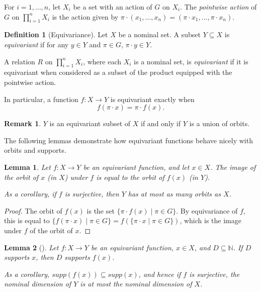 \documentclass[11pt,a4paper]{amsart}
\newtheorem{lemma}{Lemma}
\theoremstyle{definition}
\newtheorem{definition}{Definition}
\newtheorem{remark}{Remark}
\newcommand{\bb}{\mathbb}
\begin{document}
For $i=1, \ldots, n$, let $X_i$ be a set with an action of $G$ on $X_i$. 
The \emph{pointwise action} of $G$ on $\prod_{i=1}^n X_i$ is the action given by $\pi \cdot (x_1, \ldots, x_n) = (\pi \cdot x_1, \ldots, \pi \cdot x_n)$.

\begin{definition}[Equivariance]
    Let $X$ be a nominal set.
    A subset $Y \subseteq X$ is \emph{equivariant} if for any $y \in Y$ and $\pi \in G$, $\pi \cdot y \in Y$. 
    
    A relation $R$ on $\prod_{i=1}^n X_i$, where each $X_i$ is a nominal set, is \emph{equivariant} if it is equivariant when considered as a subset of the product equipped with the pointwise action. 
    
    In particular, a function $f : X \to Y$ is equivariant exactly when
    \[
    f(\pi \cdot x) = \pi \cdot f(x).
    \]
\end{definition}

\begin{remark}
    $Y$ is an equivariant subset of $X$ if and only if $Y$ is a union of orbits.
\end{remark}

The following lemmas demonstrate how equivariant functions behave nicely with orbits and supports.

\begin{lemma} \label{lem:orbit of image under equivariant function}
    Let $f : X \to Y$ be an equivariant function, and let $x \in X$. 
    The image of the orbit of $x$ (in $X$) under $f$ is equal to the orbit of $f(x)$ (in $Y$).

    As a corollary, if $f$ is surjective, then $Y$ has at most as many orbits as $X$.
\end{lemma}

\begin{proof}
    The orbit of $f(x)$ is the set $\{\pi \cdot f(x) \mid \pi \in G\}$.
    By equivariance of $f$, this is equal to $\{f(\pi \cdot x) \mid \pi \in G\} = f(\{\pi \cdot x \mid \pi \in G\})$, which is the image under $f$ of the orbit of $x$.
\end{proof}

\begin{lemma}[{\cite[Lemma 4.8]{bojanczyk-klin-lasota:automata-theory-in-nominal-sets}}] \label{lem:supports preserved under equivariant functions}
    Let $f : X \to Y$ be an equivariant function, $x \in X$, and $D \subseteq \bb N$.
    If $D$ supports $x$, then $D$ supports $f(x)$. 

    As a corollary, $supp(f(x)) \subseteq supp(x)$, and hence if $f$ is surjective, the nominal dimension of $Y$ is at most the nominal dimension of $X$.
\end{lemma}
\end{document}
